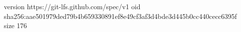 version https://git-lfs.github.com/spec/v1
oid sha256:aae501979ded79b4b659330891ef8e49cf3af3d4bde3d445b0cc440cecc6395f
size 176
